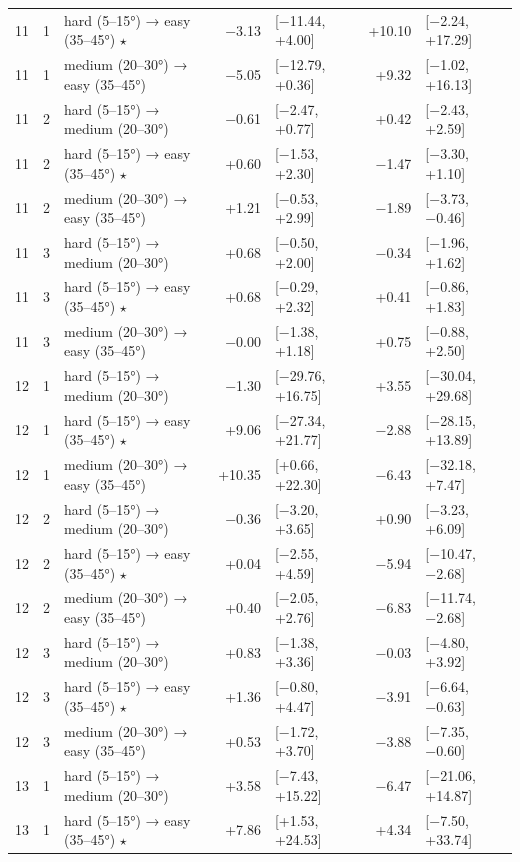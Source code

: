\begin{table}[htbp]
\begin{tabular}{rllrlrl}
    11 & 1 & hard (5–15°) → easy (35–45°) $\star$ & −3.13 & [−11.44, +4.00] & +10.10 & [−2.24, +17.29] \\
    11 & 1 & medium (20–30°) → easy (35–45°) & −5.05 & [−12.79, +0.36] & +9.32 & [−1.02, +16.13] \\
    11 & 2 & hard (5–15°) → medium (20–30°) & −0.61 & [−2.47, +0.77] & +0.42 & [−2.43, +2.59] \\
    11 & 2 & hard (5–15°) → easy (35–45°) $\star$ & +0.60 & [−1.53, +2.30] & −1.47 & [−3.30, +1.10] \\
    11 & 2 & medium (20–30°) → easy (35–45°) & +1.21 & [−0.53, +2.99] & −1.89 & [−3.73, −0.46] \\
    11 & 3 & hard (5–15°) → medium (20–30°) & +0.68 & [−0.50, +2.00] & −0.34 & [−1.96, +1.62] \\
    11 & 3 & hard (5–15°) → easy (35–45°) $\star$ & +0.68 & [−0.29, +2.32] & +0.41 & [−0.86, +1.83] \\
    11 & 3 & medium (20–30°) → easy (35–45°) & −0.00 & [−1.38, +1.18] & +0.75 & [−0.88, +2.50] \\
    12 & 1 & hard (5–15°) → medium (20–30°) & −1.30 & [−29.76, +16.75] & +3.55 & [−30.04, +29.68] \\
    12 & 1 & hard (5–15°) → easy (35–45°) $\star$ & +9.06 & [−27.34, +21.77] & −2.88 & [−28.15, +13.89] \\
    12 & 1 & medium (20–30°) → easy (35–45°) & +10.35 & [+0.66, +22.30] & −6.43 & [−32.18, +7.47] \\
    12 & 2 & hard (5–15°) → medium (20–30°) & −0.36 & [−3.20, +3.65] & +0.90 & [−3.23, +6.09] \\
    12 & 2 & hard (5–15°) → easy (35–45°) $\star$ & +0.04 & [−2.55, +4.59] & −5.94 & [−10.47, −2.68] \\
    12 & 2 & medium (20–30°) → easy (35–45°) & +0.40 & [−2.05, +2.76] & −6.83 & [−11.74, −2.68] \\
    12 & 3 & hard (5–15°) → medium (20–30°) & +0.83 & [−1.38, +3.36] & −0.03 & [−4.80, +3.92] \\
    12 & 3 & hard (5–15°) → easy (35–45°) $\star$ & +1.36 & [−0.80, +4.47] & −3.91 & [−6.64, −0.63] \\
    12 & 3 & medium (20–30°) → easy (35–45°) & +0.53 & [−1.72, +3.70] & −3.88 & [−7.35, −0.60] \\
    13 & 1 & hard (5–15°) → medium (20–30°) & +3.58 & [−7.43, +15.22] & −6.47 & [−21.06, +14.87] \\
    13 & 1 & hard (5–15°) → easy (35–45°) $\star$ & +7.86 & [+1.53, +24.53] & +4.34 & [−7.50, +33.74] \\

\end{tabular}
\end{table}
